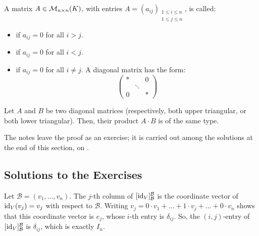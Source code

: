 \begin{definition}
\label{def:triangular_diagonal_matrices}
A matrix $A \in \mathcal{M}_{n \times n}(K)$, with entries $A = (a_{ij})_{\substack{1 \le i \le n \\ 1 \le j \le n}}$, is called:
\begin{itemize}
    \item {} if $a_{ij} = 0$ for all $i > j$.
    \item {} if $a_{ij} = 0$ for all $i < j$.
    \item {} if $a_{ij} = 0$ for all $i \neq j$. A diagonal matrix has the form:
    \begin{equation*}
        \begin{pmatrix} * & & 0 \\ & \ddots & \\ 0 & & * \end{pmatrix}
    \end{equation*}
\end{itemize}
\end{definition}

\begin{lemma}
\label{lemma:triangular_multiplication_closure}
Let $A$ and $B$ be two diagonal matrices (respectively, both upper triangular, or both lower triangular). Then, their product $A \cdot B$ is of the same type.
\end{lemma}

The notes leave the proof as an exercise; it is carried out among the solutions
at the end of this section, on .

\subsection{Solutions to the Exercises}
\label{sec:solutions_matrix_multiplication}

\begin{exercisesolution}
\label{sol:identity_represents_id}
Let $\mathcal{B} = (v_1, \dots, v_n)$. The $j$-th column of $[\operatorname{id}_V]_{\mathcal{B}}^{\mathcal{B}}$ is the coordinate vector of $\operatorname{id}_V(v_j) = v_j$ with respect to $\mathcal{B}$. Writing $v_j = 0 \cdot v_1 + \dots + 1 \cdot v_j + \dots + 0 \cdot v_n$ shows that this coordinate vector is $e_j$, whose $i$-th entry is $\delta_{ij}$. So, the $(i,j)$-entry of $[\operatorname{id}_V]_{\mathcal{B}}^{\mathcal{B}}$ is $\delta_{ij}$, which is exactly $I_n$.
\end{exercisesolution}

